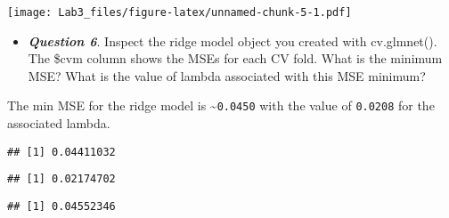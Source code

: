 \documentclass[
]{article}
\newenvironment{Shaded}{\begin{snugshade}}{\end{snugshade}}
\newcommand{\CommentTok}[1]{\textcolor[rgb]{0.56,0.35,0.01}{\textit{#1}}}
\newcommand{\FloatTok}[1]{\textcolor[rgb]{0.00,0.00,0.81}{#1}}
\newcommand{\FunctionTok}[1]{\textcolor[rgb]{0.13,0.29,0.53}{\textbf{#1}}}
\newcommand{\NormalTok}[1]{#1}
\newcommand{\SpecialCharTok}[1]{\textcolor[rgb]{0.81,0.36,0.00}{\textbf{#1}}}
\providecommand{\tightlist}{%
  \setlength{\itemsep}{0pt}\setlength{\parskip}{0pt}}
\begin{document}
\texttt{[image: Lab3\_files/figure-latex/unnamed-chunk-5-1.pdf]}

\begin{itemize}
\tightlist
\item
  \textbf{\emph{Question 6}}. Inspect the ridge model object you created
  with cv.glmnet(). The \$cvm column shows the MSEs for each CV fold.
  What is the minimum MSE? What is the value of lambda associated with
  this MSE minimum?
\end{itemize}

The min MSE for the ridge model is \textasciitilde{}\texttt{0.0450} with
the value of \texttt{0.0208} for the associated lambda.

\begin{Shaded}
\end{Shaded}

\begin{verbatim}
## [1] 0.04411032
\end{verbatim}

\begin{Shaded}
\end{Shaded}

\begin{verbatim}
## [1] 0.02174702
\end{verbatim}

\begin{Shaded}
\end{Shaded}

\begin{verbatim}
## [1] 0.04552346
\end{verbatim}
\end{document}
